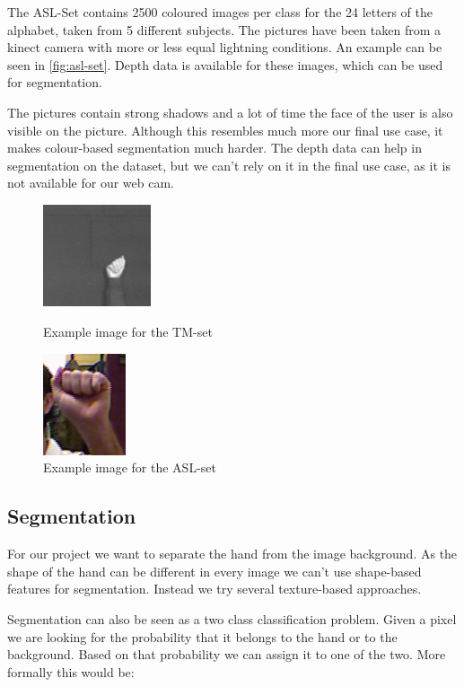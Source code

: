 \documentclass[letterpaper, 10 pt, conference]{ieeeconf}  %
\begin{document}
The ASL-Set contains 2500 coloured images per class for the 24 letters of the alphabet, taken from 5 different subjects. The pictures have been taken from a kinect camera with more or less equal lightning conditions. An example can be seen in \autoref{fig:asl-set}. Depth data is available for these images, which can be used for segmentation.

The pictures contain strong shadows and a lot of time the face of the user is also visible on the picture. Although this resembles much more our final use case, it makes colour-based segmentation much harder. The depth data can help in segmentation on the dataset, but we can't rely on it in the final use case, as it is not available for our web cam.

\begin{figure}
\centering
\begin{minipage}{0.4\linewidth}
	\centering
\includegraphics[height=3cm]{a-tm}
\caption{Example image for the TM-set}
\label{fig:tm-set}
\end{minipage}
\hfill
\begin{minipage}{0.4\linewidth}
	\centering
\includegraphics[height=3cm]{a-asl}
\caption{Example image for the ASL-set}
\label{fig:asl-set}
\end{minipage}
\end{figure}


\subsection{Segmentation}

For our project we want to separate the hand from the image background. As the shape of the hand can be different in every image we can't use shape-based features for segmentation. Instead we try several texture-based approaches.

Segmentation can also be seen as a two class classification problem. Given a pixel we are looking for the probability that it belongs to the hand or to the background. Based on that probability we can assign it to one of the two. More formally this would be:
\end{document}
